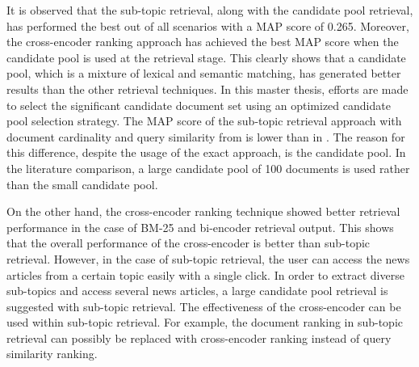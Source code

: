 It is observed that the sub-topic retrieval, along with the candidate pool retrieval, has performed the best out of all scenarios with a MAP score of 0.265. Moreover, the cross-encoder ranking approach has achieved the best MAP score when the candidate pool is used at the retrieval stage. This clearly shows that a candidate pool, which is a mixture of lexical and semantic matching, has generated better results than the other retrieval techniques. In this master thesis, efforts are made to select the significant candidate document set using an optimized candidate pool selection strategy. The MAP score of the sub-topic retrieval approach with document cardinality and query similarity from  is lower than in . The reason for this difference, despite the usage of the exact approach, is the candidate pool. In the literature comparison, a large candidate pool of 100 documents is used rather than the small candidate pool.

On the other hand, the cross-encoder ranking technique showed better retrieval performance in the case of BM-25 and bi-encoder retrieval output. This shows that the overall performance of the cross-encoder is better than sub-topic retrieval. However, in the case of sub-topic retrieval, the user can access the news articles from a certain topic easily with a single click. In order to extract diverse sub-topics and access several news articles, a large candidate pool retrieval is suggested with sub-topic retrieval. The effectiveness of the cross-encoder can be used within sub-topic retrieval. For example, the document ranking in sub-topic retrieval can possibly be replaced with cross-encoder ranking instead of query similarity ranking.


 


